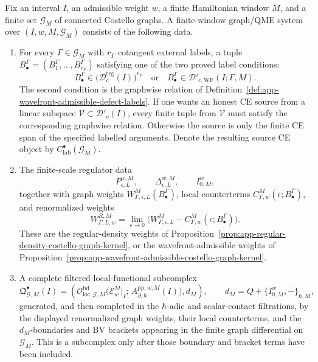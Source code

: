 \begin{defn}\label{defn:finite-window-graph-qme-system}
  Fix an interval \(I\), an admissible weight \(w\), a finite Hamiltonian
  window \(M\), and a finite set \(\mathcal G_M\) of connected Costello
  graphs.  A finite-window graph/QME system over \((I,w,M,\mathcal G_M)\)
  consists of the following data.
  \begin{enumerate}[label=(F\arabic*)]
    \item For every \(\Gamma\in\mathcal G_M\) with \(r_\Gamma\) cotangent
    external labels, a tuple
    \(B^\Gamma_\bullet=(B^\Gamma_1,\ldots,B^\Gamma_{r_\Gamma})\) satisfying
    one of the two proved label conditions:
    \[
      B^\Gamma_\bullet\in
      \bigl(\mathcal D^{\mathrm{reg}}_c(I)\bigr)^{r_\Gamma}
      \quad\text{or}\quad
      B^\Gamma_\bullet\in
      \mathcal D'_{c,\mathrm{WF}}(I;\Gamma,M).
    \]
    The second condition is the graphwise relation of
    Definition~\ref{def:app-wavefront-admissible-defect-labels}.  If one
    wants an honest CE source from a linear subspace
    \(\mathcal V\subset\mathcal D'_c(I)\), every finite tuple from
    \(\mathcal V\) must satisfy the corresponding graphwise relation.
    Otherwise the source is only the finite CE span of the specified
    labelled arguments.  Denote the resulting source CE object by
    \(C^\bullet_{\mathrm{lab}}(\mathcal G_M)\).

    \item The finite-scale regulator data
    \[
      P_{\epsilon,L}^{w,M},\qquad \Delta_{\epsilon,L}^{w,M},
      \qquad I_{0,M}^{w},
    \]
    together with graph weights
    \(W^M_{\Gamma,\epsilon,L}(B^\Gamma_\bullet)\), local counterterms
    \(C^M_{\Gamma,w}(\epsilon;B^\Gamma_\bullet)\), and renormalized
    weights
    \[
      W^{R,M}_{\Gamma,L,w}
        =
      \lim_{\epsilon\to0}
      \bigl(
        W^M_{\Gamma,\epsilon,L}
        -
        C^M_{\Gamma,w}(\epsilon;B^\Gamma_\bullet)
      \bigr).
    \]
    These are the regular-density weights of
    Proposition~\ref{prop:app-regular-density-costello-graph-kernel}, or
    the wavefront-admissible weights of
    Proposition~\ref{prop:app-wavefront-admissible-costello-graph-kernel}.

    \item A complete filtered local-functional subcomplex
    \[
      \mathfrak Q^\bullet_{\mathcal G,M}(I)
        =
      \left(
        \mathcal O^{\mathrm{bd}}_{\mathrm{loc},\mathcal G,M}\bigl(
          \mathcal E_w^M|_I;\,
          A_{\partial,\hbar}^{\mathrm{pp},w,M}(I)\bigr),
        d_M
      \right),
      \qquad
      d_M=Q+\{I^w_{0,M},-\}_{\hbar,M},
    \]
    generated, and then completed in the \(\hbar\)-adic and scalar-contact
    filtrations, by the displayed renormalized graph weights, their local
    counterterms, and the \(d_M\)-boundaries and BV brackets appearing in the
    finite graph differential on \(\mathcal G_M\).  This is a subcomplex
    only after those boundary and bracket terms have been included.


\end{enumerate}
\end{defn}
